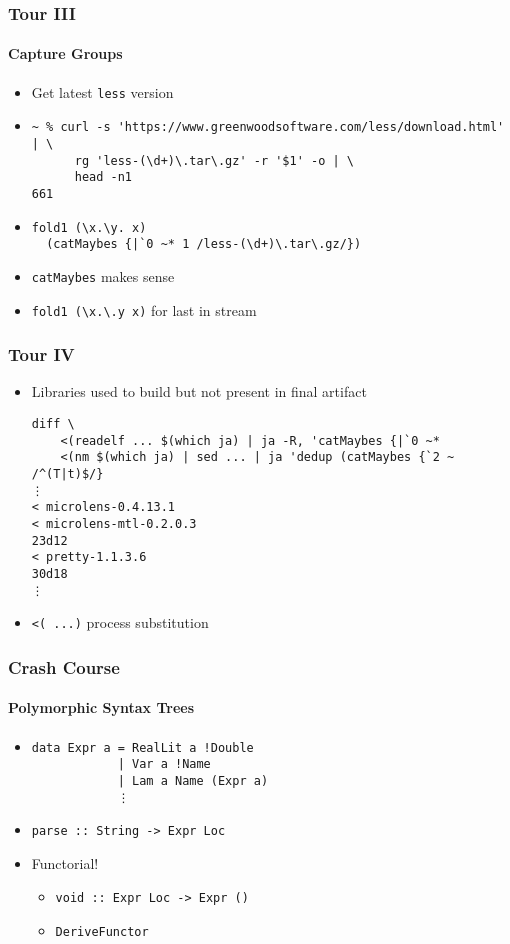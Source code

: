 \documentclass{beamer}
\begin{document}
\begin{frame}[fragile]
  \frametitle{Tour III}
  \framesubtitle{Capture Groups}
  \begin{itemize}
    \item Get latest \verb|less| version
    \item
      \begin{verbatim}
~ % curl -s 'https://www.greenwoodsoftware.com/less/download.html' | \
      rg 'less-(\d+)\.tar\.gz' -r '$1' -o | \
      head -n1
661
      \end{verbatim}
    \item
      \begin{verbatim}
fold1 (\x.\y. x) 
  (catMaybes {|`0 ~* 1 /less-(\d+)\.tar\.gz/})
      \end{verbatim}
    \item \verb|catMaybes| makes sense
    \item \verb|fold1 (\x.\.y x)| for last in stream
  \end{itemize}
\end{frame}

\begin{frame}[fragile]
  \frametitle{Tour IV}
  \begin{itemize}
    \item Libraries used to build but not present in final artifact
      \begin{verbatim}
diff \
    <(readelf ... $(which ja) | ja -R, 'catMaybes {|`0 ~*
    <(nm $(which ja) | sed ... | ja 'dedup (catMaybes {`2 ~ /^(T|t)$/}
⋮
< microlens-0.4.13.1
< microlens-mtl-0.2.0.3
23d12
< pretty-1.1.3.6
30d18
⋮
      \end{verbatim}
    \item \verb|<( ...)| process substitution
  \end{itemize}
\end{frame}


\begin{frame}[fragile]
  \frametitle{Crash Course}
  \framesubtitle{Polymorphic Syntax Trees}
    \begin{itemize}
      \item
      \begin{verbatim}
data Expr a = RealLit a !Double
            | Var a !Name
            | Lam a Name (Expr a)
            ⋮
\end{verbatim}
      \item \verb|parse :: String -> Expr Loc|
      \item Functorial!
        \begin{itemize}
          \item \verb|void :: Expr Loc -> Expr ()|
          \item \verb|DeriveFunctor|
        \end{itemize}
    \end{itemize}
\end{frame}
\end{document}
